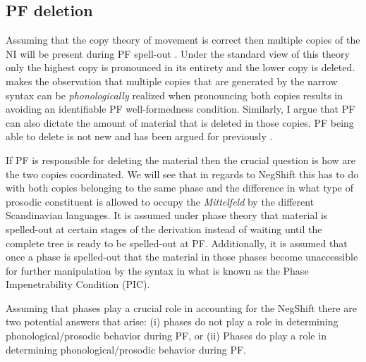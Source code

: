 \documentclass[12pt, letterpaper]{article}
\begin{document}
\subsection{PF deletion} \label{sec:NEXT}

Assuming that the copy theory of movement is correct then multiple copies of the NI will be present during PF spell-out \citep{chomskyMinimalistProgramLinguistic1993}. Under the standard view of this theory only the highest copy is pronounced in its entirety and the lower copy is deleted. \citet{kandybowiczGrammarRepetitionNupe2008} makes the observation that multiple copies that are generated by the narrow syntax can be \emph{phonologically} realized when pronouncing both copies results in avoiding an identifiable PF well-formedness condition. Similarly, I argue that PF can also dictate the amount of material that is deleted in those copies. PF being able to delete is not new and has been argued for previously \citep{chomskyTheoryPrinciplesParameters1993,merchantSyntaxSilenceSluicing2001,foxSuccessiveCyclicMovementIsland2003,ottDeletionClausalEllipsis2016}. 

If PF is responsible for deleting the material then the crucial question is how are the two copies coordinated. We will see that in regards to NegShift this has to do with both copies belonging to the same phase and the difference in what type of prosodic constituent is allowed to occupy the \emph{Mittelfeld} by the different Scandinavian languages. It is assumed under phase theory \citep{chomskyDerivationPhase2001,chomskyPhases2008} that material is spelled-out at certain stages of the derivation instead of waiting until the complete tree is ready to be spelled-out at PF. Additionally, it is assumed that once a phase is spelled-out that the material in those phases become unaccessible for further manipulation by the syntax in what is known as the Phase Impenetrability Condition (PIC). 

Assuming that phases play a crucial role in accounting for the NegShift there are two potential answers that arise: (i) phases do not play a role in determining phonological/prosodic behavior during PF, or (ii) Phases do play a role in determining phonological/prosodic behavior during PF.
\end{document}
